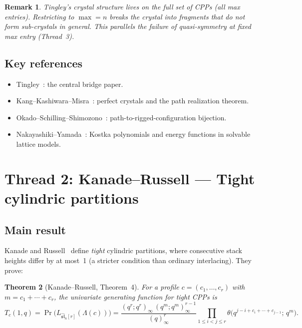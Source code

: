 \documentclass[11pt]{article}
\newtheorem{theorem}{Theorem}
\newtheorem{remark}[theorem]{Remark}
\newcommand{\sln}{\widehat{\mathfrak{sl}}_n}
\begin{document}
\begin{remark}
Tingley's crystal structure lives on the \emph{full} set of CPPs
(all max entries). Restricting to $\max = n$ breaks the crystal
into fragments that do not form sub-crystals in general.
This parallels the failure of quasi-symmetry at fixed max entry
(Thread~3).
\end{remark}

\subsection{Key references}

\begin{itemize}
  \item Tingley~\cite{tingley-2008}: the central bridge paper.
  \item Kang--Kashiwara--Misra~\cite{kkm-1992}: perfect crystals
    and the path realization theorem.
  \item Okado--Schilling--Shimozono~\cite{oss-2001}: path-to-rigged-configuration bijection.
  \item Nakayashiki--Yamada~\cite{ny-1995}: Kostka polynomials and
    energy functions in solvable lattice models.
\end{itemize}

\section{Thread 2: Kanade--Russell --- Tight cylindric partitions}
\label{sec:tight}

\subsection{Main result}

Kanade and Russell~\cite{kanade-russell-2023} define
\emph{tight} cylindric partitions, where consecutive stack
heights differ by at most~1 (a stricter condition than ordinary
interlacing). They prove:

\begin{theorem}[Kanade--Russell, Theorem~4]
For a profile $c = (c_1, \ldots, c_r)$ with
$m = c_1 + \cdots + c_r$, the univariate generating function
for tight CPPs is
\[
  T_c(1,q)
  = \Pr\bigl(L_{\sln[r]}(\Lambda(c))\bigr)
  = \frac{(q^r; q^r)_\infty\, (q^m; q^m)_\infty^{r-1}}
         {(q)_\infty^r}
    \prod_{1 \le i < j \le r}
    \theta\bigl(q^{j - i + c_i + \cdots + c_{j-1}};\, q^m\bigr).
\]
\end{theorem}
\end{document}
